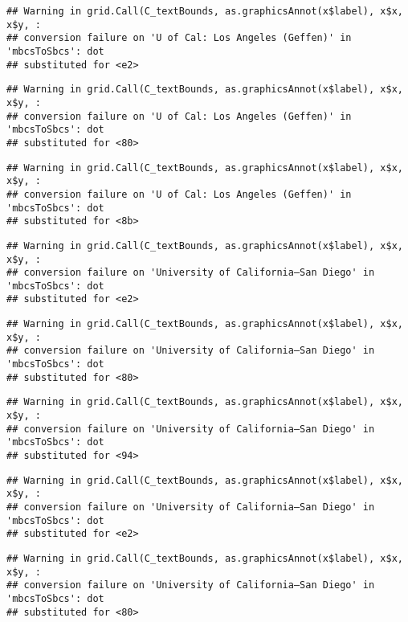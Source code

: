 \documentclass[]{article}
\begin{document}
\begin{verbatim}
## Warning in grid.Call(C_textBounds, as.graphicsAnnot(x$label), x$x, x$y, :
## conversion failure on 'U of Cal: ​Los Angeles (Geffen)' in 'mbcsToSbcs': dot
## substituted for <e2>
\end{verbatim}

\begin{verbatim}
## Warning in grid.Call(C_textBounds, as.graphicsAnnot(x$label), x$x, x$y, :
## conversion failure on 'U of Cal: ​Los Angeles (Geffen)' in 'mbcsToSbcs': dot
## substituted for <80>
\end{verbatim}

\begin{verbatim}
## Warning in grid.Call(C_textBounds, as.graphicsAnnot(x$label), x$x, x$y, :
## conversion failure on 'U of Cal: ​Los Angeles (Geffen)' in 'mbcsToSbcs': dot
## substituted for <8b>
\end{verbatim}

\begin{verbatim}
## Warning in grid.Call(C_textBounds, as.graphicsAnnot(x$label), x$x, x$y, :
## conversion failure on 'University of California—​San Diego' in 'mbcsToSbcs': dot
## substituted for <e2>
\end{verbatim}

\begin{verbatim}
## Warning in grid.Call(C_textBounds, as.graphicsAnnot(x$label), x$x, x$y, :
## conversion failure on 'University of California—​San Diego' in 'mbcsToSbcs': dot
## substituted for <80>
\end{verbatim}

\begin{verbatim}
## Warning in grid.Call(C_textBounds, as.graphicsAnnot(x$label), x$x, x$y, :
## conversion failure on 'University of California—​San Diego' in 'mbcsToSbcs': dot
## substituted for <94>
\end{verbatim}

\begin{verbatim}
## Warning in grid.Call(C_textBounds, as.graphicsAnnot(x$label), x$x, x$y, :
## conversion failure on 'University of California—​San Diego' in 'mbcsToSbcs': dot
## substituted for <e2>
\end{verbatim}

\begin{verbatim}
## Warning in grid.Call(C_textBounds, as.graphicsAnnot(x$label), x$x, x$y, :
## conversion failure on 'University of California—​San Diego' in 'mbcsToSbcs': dot
## substituted for <80>
\end{verbatim}
\end{document}
